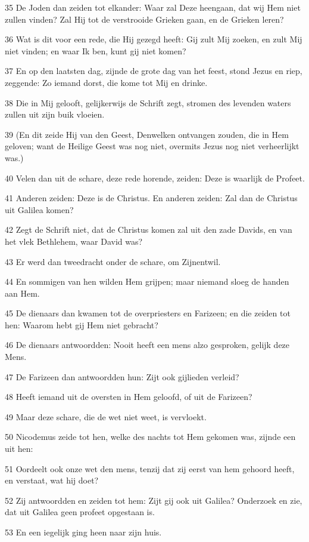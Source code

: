 \par 35 De Joden dan zeiden tot elkander: Waar zal Deze heengaan, dat wij Hem niet zullen vinden? Zal Hij tot de verstrooide Grieken gaan, en de Grieken leren?
\par 36 Wat is dit voor een rede, die Hij gezegd heeft: Gij zult Mij zoeken, en zult Mij niet vinden; en waar Ik ben, kunt gij niet komen?
\par 37 En op den laatsten dag, zijnde de grote dag van het feest, stond Jezus en riep, zeggende: Zo iemand dorst, die kome tot Mij en drinke.
\par 38 Die in Mij gelooft, gelijkerwijs de Schrift zegt, stromen des levenden waters zullen uit zijn buik vloeien.
\par 39 (En dit zeide Hij van den Geest, Denwelken ontvangen zouden, die in Hem geloven; want de Heilige Geest was nog niet, overmits Jezus nog niet verheerlijkt was.)
\par 40 Velen dan uit de schare, deze rede horende, zeiden: Deze is waarlijk de Profeet.
\par 41 Anderen zeiden: Deze is de Christus. En anderen zeiden: Zal dan de Christus uit Galilea komen?
\par 42 Zegt de Schrift niet, dat de Christus komen zal uit den zade Davids, en van het vlek Bethlehem, waar David was?
\par 43 Er werd dan tweedracht onder de schare, om Zijnentwil.
\par 44 En sommigen van hen wilden Hem grijpen; maar niemand sloeg de handen aan Hem.
\par 45 De dienaars dan kwamen tot de overpriesters en Farizeen; en die zeiden tot hen: Waarom hebt gij Hem niet gebracht?
\par 46 De dienaars antwoordden: Nooit heeft een mens alzo gesproken, gelijk deze Mens.
\par 47 De Farizeen dan antwoordden hun: Zijt ook gijlieden verleid?
\par 48 Heeft iemand uit de oversten in Hem geloofd, of uit de Farizeen?
\par 49 Maar deze schare, die de wet niet weet, is vervloekt.
\par 50 Nicodemus zeide tot hen, welke des nachts tot Hem gekomen was, zijnde een uit hen:
\par 51 Oordeelt ook onze wet den mens, tenzij dat zij eerst van hem gehoord heeft, en verstaat, wat hij doet?
\par 52 Zij antwoordden en zeiden tot hem: Zijt gij ook uit Galilea? Onderzoek en zie, dat uit Galilea geen profeet opgestaan is.
\par 53 En een iegelijk ging heen naar zijn huis.

